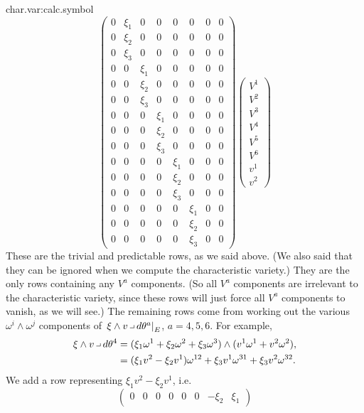 \begin{answer}{char.var:calc.symbol}
\[\begin{pmatrix}
0 & \xi_1 & 0 & 0 & 0 & 0 & 0 & 0 \\
0 & \xi_2 & 0 & 0 & 0 & 0 & 0 & 0 \\
0 & \xi_3 & 0 & 0 & 0 & 0 & 0 & 0 \\
0 & 0 & \xi_1 & 0 & 0 & 0 & 0 & 0 \\
0 & 0 & \xi_2 & 0 & 0 & 0 & 0 & 0 \\
0 & 0 & \xi_3 & 0 & 0 & 0 & 0 & 0 \\
0 & 0 & 0 & \xi_1 & 0 & 0 & 0 & 0 \\
0 & 0 & 0 & \xi_2 & 0 & 0 & 0 & 0 \\
0 & 0 & 0 & \xi_3 & 0 & 0 & 0 & 0 \\
0 & 0 & 0 & 0 & \xi_1 & 0 & 0 & 0 \\
0 & 0 & 0 & 0 & \xi_2 & 0 & 0 & 0 \\
0 & 0 & 0 & 0 & \xi_3 & 0 & 0 & 0 \\
0 & 0 & 0 & 0 & 0 & \xi_1 & 0 & 0 \\
0 & 0 & 0 & 0 & 0 & \xi_2 & 0 & 0 \\
0 & 0 & 0 & 0 & 0 & \xi_3 & 0 & 0
\end{pmatrix}
\begin{pmatrix}
V^1\\
V^2\\
V^3\\
V^4\\
V^5\\
V^6\\
v^1\\
v^2
\end{pmatrix}
\]
These are the trivial and predictable rows, as we said above.
(We also said that they can be ignored when we compute the characteristic variety.)
They are the only rows containing any \(V^a\) components.
(So all \(V^a\) components are irrelevant to the characteristic variety, since these rows will just force all \(V^a\) components to vanish, as we will see.)
The remaining rows come from working out the various \(\omega^i\wedge\omega^j\) components of \(\left.\xi\wedge v\hook d\theta^a\right|_E\), \(a=4,5,6\).
For example,
\begin{align*}
\xi\wedge v\hook d\theta^4
&=
(\xi_1\omega^1+\xi_2\omega^2+\xi_3\omega^3)
\wedge
(v^1\omega^1+v^2\omega^2),
\\
&=
(\xi_1v^2-\xi_2v^1)\omega^{12}+\xi_3v^1\omega^{31}+\xi_3v^2\omega^{32}.
\end{align*}
We add a row representing \(\xi_1v^2-\xi_2v^1\), i.e.
\[
\begin{pmatrix}
0& 0& 0& 0& 0& 0 & -\xi_2 & \xi_1 

\end{pmatrix}\]
\end{answer}
